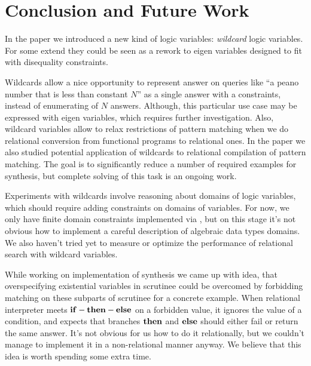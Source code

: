 
\section{Conclusion and Future Work}

In  the paper we introduced a new kind of logic variables: \emph{wildcard} logic variables.
For some extend they could be seen as a rework to eigen variables designed to fit with disequality constraints.

Wildcards allow a nice opportunity to represent answer on queries like ``a peano number that is less than constant $N$'' as a single answer with a constraints, instead of enumerating of $N$ answers. Although, this particular use case may be expressed with eigen variables, which requires further investigation. Also, wildcard variables allow to relax restrictions of pattern matching when we do relational conversion from functional programs to relational ones.
In the paper we also studied potential application of wildcards to relational compilation of pattern matching. The goal is to significantly reduce a number of required examples for synthesis, but complete solving of this task is an ongoing work.

Experiments with wildcards involve reasoning about domains of logic variables, which should require adding constraints on  domains of variables. For now, we only have finite domain constraints implemented via \Zthree{}, but on this stage it's not obvious how to implement a  careful description of algebraic data types domains. We also haven't tried yet to measure or optimize the performance of relational search with wildcard variables.

While working on implementation of synthesis we came up with idea, that overspecifying existential variables in scrutinee could be overcomed by forbidding matching on these subparts of scrutinee for a concrete example.
When relational interpreter meets $\mathbf{if-then-else}$ on a forbidden value, it ignores the value of a condition, and expects that  branches $\mathbf{then}$ and $\mathbf{else}$ should either fail or return the same answer.
It's not obvious for us how to do it relationally, but we couldn't manage to implement it in a non-relational manner anyway. We believe that this idea is worth spending some extra time.









